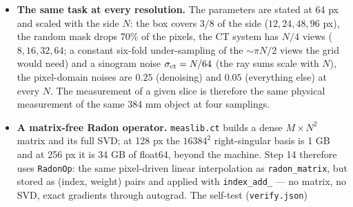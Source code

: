 \documentclass[11pt]{article}
\begin{document}
\begin{itemize}
        reverse and $1.9 \times 10^{-5}$, $3.5 \times 10^{-7}$ and $7.0
        \times 10^{-5}$ against the eager one --- the same to every printed
        digit whether the new reverse runs eagerly or from its captured
        graphs, so the graphs are exact and the residue is fp32 operation
        order (a CPU check on a small random model agrees to $1$--$4 \times
        10^{-6}$); on the 64-px prior ($T = 256$) $1.8 \times 10^{-5}$, $5.9
        \times 10^{-7}$ and $1.3 \times 10^{-5}$. Measured cost of a
        forward-and-backward pass at batch 18: 3.1 s at $T = 256$ against
        7.7 s (peak 2.4 GB against 9.3), and 17.2 s at $T = 1024$ with chunks
        of 128 (18.6 s with 256; 6.0 GB) --- 4.8 h for a 1000-step gallery
        instead of the extrapolated forty. At $T = 256$ the 1.5 ms per
        block and token step is the floor of some 400 kernel launches
        rather than cache traffic (about 0.3 ms at this size), which is why
        the gain over the first reverse is $2.5\times$ and not the ratio of
        the two traffics; at $T = 1024$ (2.1 ms) the traffic adds roughly
        as much again as the floor. The 32- and 64-px galleries ran with
        \texttt{FastReverse}; the two compute the same map, so they were
        not re-run.
  \item \textbf{The same task at every resolution.} The parameters are
        stated at 64 px and scaled with the side $N$: the box covers
        $3/8$ of the side ($12, 24, 48, 96$ px), the random mask drops 70\%
        of the pixels, the CT system has $N/4$ views ($8, 16, 32, 64$; a
        constant six-fold under-sampling of the $\sim\pi N/2$ views the
        grid would need) and a sinogram noise $\sigma_{\rm ct} = N/64$
        (the ray sums scale with $N$), the pixel-domain noises are $0.25$
        (denoising) and $0.05$ (everything else) at every $N$. The
        measurement of a given slice is therefore the same physical
        measurement of the same 384 mm object at four samplings.
  \item \textbf{A matrix-free Radon operator.} \texttt{measlib.ct} builds a
        dense $M \times N^2$ matrix and its full SVD; at 128 px the
        $16384^2$ right-singular basis is 1 GB and at 256 px it is 34 GB of
        float64, beyond the machine. Step 14 therefore uses
        \texttt{RadonOp}: the same pixel-driven linear interpolation as
        \texttt{radon\_matrix}, but stored as (index, weight) pairs and
        applied with \texttt{index\_add\_} --- no matrix, no SVD, exact
        gradients through autograd. The self-test (\texttt{verify.json})

\end{itemize}
\end{document}
